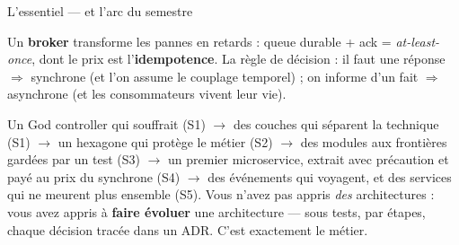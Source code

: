 \documentclass[aspectratio=169,11pt]{beamer}
\begin{document}
\begin{frame}{L'essentiel — et l'arc du semestre}
\begin{ucadret}
{\footnotesize Un \textbf{broker} transforme les pannes en retards : queue durable + ack = \emph{at-least-once}, dont le prix est l'\textbf{idempotence}. La règle de décision : il faut une réponse $\Rightarrow$ synchrone (et l'on assume le couplage temporel) ; on informe d'un fait $\Rightarrow$ asynchrone (et les consommateurs vivent leur vie).}
\end{ucadret}
\begin{ucadfront}
{\footnotesize Un God controller qui souffrait (S1) $\to$ des couches qui séparent la technique (S1) $\to$ un hexagone qui protège le métier (S2) $\to$ des modules aux frontières gardées par un test (S3) $\to$ un premier microservice, extrait avec précaution et payé au prix du synchrone (S4) $\to$ des événements qui voyagent, et des services qui ne meurent plus ensemble (S5). Vous n'avez pas appris \emph{des} architectures : vous avez appris à \textbf{faire évoluer} une architecture — sous tests, par étapes, chaque décision tracée dans un ADR. C'est exactement le métier.}
\end{ucadfront}
\end{frame}
\end{document}
